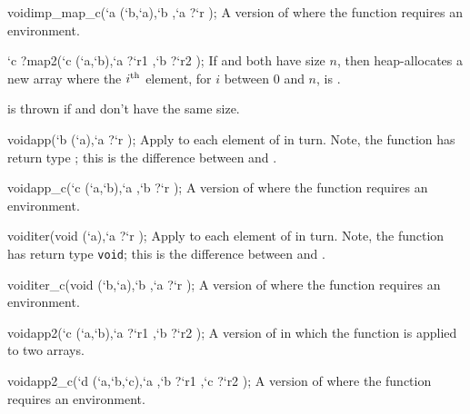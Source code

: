 \begin{defun2}{void}{imp_map_c}{(`a (`b,`a),`b ,`a {?}`r );}
  A version of  where the function  requires an
  environment.
\end{defun2}

\begin{defun2}{`c ?}{map2}{(`c (`a,`b),`a {?}`r1 ,`b {?}`r2 );}
  If  and  both have size $n$, then 
  heap-allocates a new array where the $i^{\rm th}$ element, for $i$
  between 0 and $n$, is .

   is thrown if  and  don't have
  the same size.
\end{defun2}

\begin{defun2}{void}{app}{(`b (`a),`a {?}`r );}
  Apply  to each element of  in turn.  Note, the
  function  has return type ; this is the difference
  between  and .
\end{defun2}

\begin{defun2}{void}{app_c}{(`c (`a,`b),`a ,`b {?}`r );}
  A version of  where the function requires an environment.
\end{defun2}

\begin{defun2}{void}{iter}{(void (`a),`a {?}`r );}
  Apply  to each element of  in turn.  Note, the
  function  has return type \texttt{void}; this is the
  difference between  and .
\end{defun2}

\begin{defun2}{void}{iter_c}{(void (`b,`a),`b ,`a {?}`r );}
  A version of  where the function requires an environment.
\end{defun2}


\begin{defun2}{void}{app2}{(`c (`a,`b),`a {?}`r1 ,`b {?}`r2 );}
  A version of  in which the function is applied to two arrays.
\end{defun2}


\begin{defun2}{void}{app2_c}{(`d (`a,`b,`c),`a ,`b {?}`r1 ,`c {?}`r2 );}
  A version of  where the function requires an environment.
\end{defun2}


